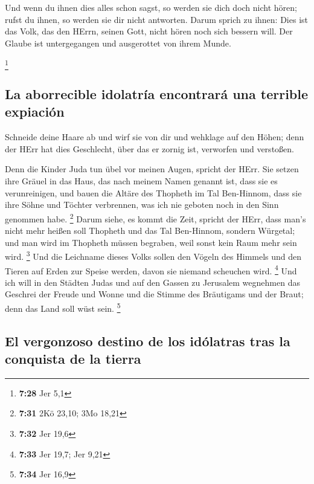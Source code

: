  Und wenn du ihnen dies alles schon sagst, so werden sie
dich doch nicht hören; rufst du ihnen, so werden sie dir nicht
antworten.  Darum sprich zu ihnen: Dies ist das Volk, das
den HErrn, seinen Gott, nicht hören noch sich bessern will. Der Glaube
ist untergegangen und ausgerottet von ihrem Munde.

\footnote{\textbf{7:28} Jer 5,1}

\hypertarget{la-aborrecible-idolatruxeda-encontraruxe1-una-terrible-expiaciuxf3n}{%
\subsection{La aborrecible idolatría encontrará una terrible
expiación}\label{la-aborrecible-idolatruxeda-encontraruxe1-una-terrible-expiaciuxf3n}}

 Schneide deine Haare ab und wirf sie von dir und
wehklage auf den Höhen; denn der HErr hat dies Geschlecht, über das er
zornig ist, verworfen und verstoßen.

 Denn die Kinder Juda tun übel vor meinen Augen, spricht
der HErr. Sie setzen ihre Gräuel in das Haus, das nach meinem Namen
genannt ist, dass sie es verunreinigen,  und bauen die
Altäre des Thopheth im Tal Ben-Hinnom, dass sie ihre Söhne und Töchter
verbrennen, was ich nie geboten noch in den Sinn genommen habe.
\footnote{\textbf{7:31} 2Kö 23,10; 3Mo 18,21}  Darum
siehe, es kommt die Zeit, spricht der HErr, dass man's nicht mehr heißen
soll Thopheth und das Tal Ben-Hinnom, sondern Würgetal; und man wird im
Thopheth müssen begraben, weil sonst kein Raum mehr sein wird.
\footnote{\textbf{7:32} Jer 19,6}  Und die Leichname
dieses Volks sollen den Vögeln des Himmels und den Tieren auf Erden zur
Speise werden, davon sie niemand scheuchen wird. \footnote{\textbf{7:33}
  Jer 19,7; Jer 9,21}  Und ich will in den Städten Judas
und auf den Gassen zu Jerusalem wegnehmen das Geschrei der Freude und
Wonne und die Stimme des Bräutigams und der Braut; denn das Land soll
wüst sein. \footnote{\textbf{7:34} Jer 16,9}

\hypertarget{el-vergonzoso-destino-de-los-iduxf3latras-tras-la-conquista-de-la-tierra}{%
\subsection{El vergonzoso destino de los idólatras tras la conquista de
la
tierra}\label{el-vergonzoso-destino-de-los-iduxf3latras-tras-la-conquista-de-la-tierra}}

